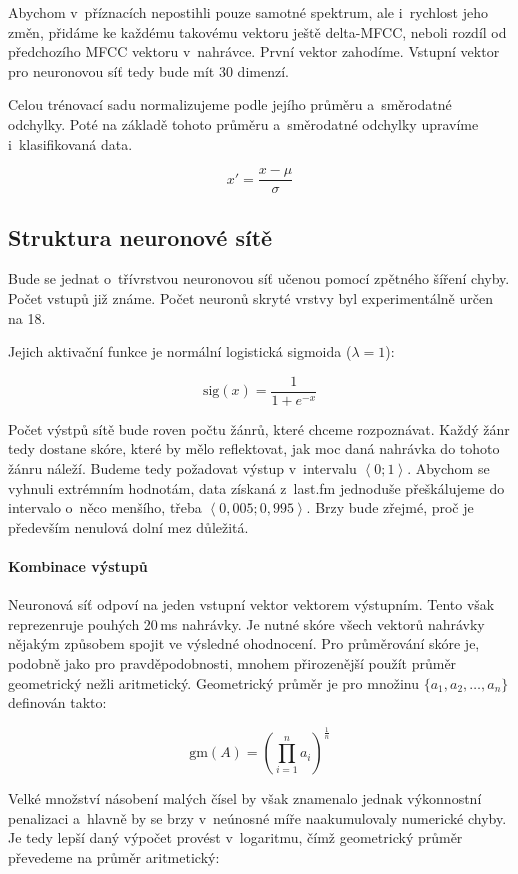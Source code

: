 \documentclass[10pt,a4paper]{article}
\begin{document}
Abychom v~příznacích nepostihli pouze samotné spektrum, ale i~rychlost jeho změn,
přidáme ke každému takovému vektoru ještě delta-MFCC, neboli rozdíl
od předchozího MFCC vektoru v~nahrávce. První vektor zahodíme.
Vstupní vektor pro neuronovou síť tedy bude mít 30 dimenzí.

Celou trénovací sadu normalizujeme podle jejího průměru a~směrodatné odchylky.
Poté na základě tohoto průměru a~směrodatné odchylky upravíme i~klasifikovaná data.

$$ x' = \frac{x-\mu}{\sigma} $$

\subsection{Struktura neuronové sítě}

Bude se jednat o~třívrstvou neuronovou síť učenou pomocí zpětného šíření chyby.
Počet vstupů již známe.
Počet neuronů skryté vrstvy byl experimentálně určen na 18.

Jejich aktivační funkce je normální logistická sigmoida ($\lambda = 1$):

$$ \mbox{sig}(x) = \frac{1}{1+e^{-x}} $$

Počet výstpů sítě bude roven počtu žánrů, které chceme rozpoznávat.
Každý žánr tedy dostane skóre, které by mělo reflektovat, jak moc daná nahrávka
do tohoto žánru náleží. Budeme tedy požadovat výstup v~intervalu $\left<0; 1\right>$.
Abychom se vyhnuli extrémním hodnotám, data získaná z~last.fm jednoduše přeškálujeme
do intervalo o~něco menšího, třeba $\left<0,005; 0,995\right>$. Brzy bude zřejmé, proč je především
nenulová dolní mez důležitá.

\paragraph{Kombinace výstupů} Neuronová síť odpoví na jeden vstupní vektor vektorem výstupním.
Tento však reprezenruje pouhých 20\,ms nahrávky.
Je nutné skóre všech vektorů nahrávky nějakým způsobem spojit ve výsledné ohodnocení.
Pro průměrování skóre je, podobně jako pro pravděpodobnosti, mnohem přirozenější
použít průměr geometrický nežli aritmetický.
Geometrický průměr je pro množinu $\{a_1,a_2,\ldots,a_n\}$ definován takto:

$$ \mbox{gm}(A) = \left(\prod_{i=1}^na_i\right)^{\frac{1}{n}} $$

Velké množství násobení malých čísel by však znamenalo jednak výkonnostní
penalizaci a~hlavně by se brzy v~neúnosné míře naakumulovaly numerické chyby.
Je tedy lepší daný výpočet provést v~logaritmu, čímž geometrický průměr
převedeme na průměr aritmetický:
\end{document}

